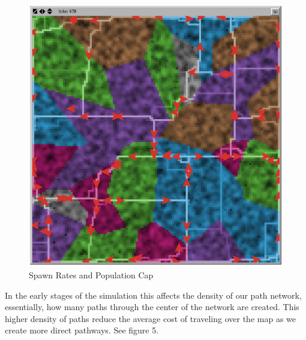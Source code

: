 \documentclass[conference]{IEEEtran}
\begin{document}
\begin{figure}[h]
\begin{center}
\includegraphics[scale=0.4]{image/results4}
\end{center}
\caption{Spawn Rates and Population Cap}
\end{figure}
	
	In the early stages of the simulation this affects the density of our path network, essentially, how many paths through the center of the network are created. This higher density of paths reduce the average cost of traveling over the map as we create more direct pathways. See figure 5.
	
\end{document}

